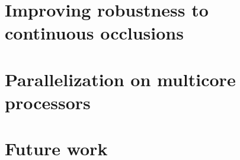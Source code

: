 \documentclass[draftthesis,tocnosub,noragright,centerchapter,12pt]{uiucecethesis09}
\begin{document}
\chapter{Improving robustness to continuous occlusions}
\label{chap:iccv}
%

\chapter{Parallelization on multicore processors}
%

\chapter{Future work}
\label{chap:future}
%

%

\appendix 


\backmatter



\end{document}
